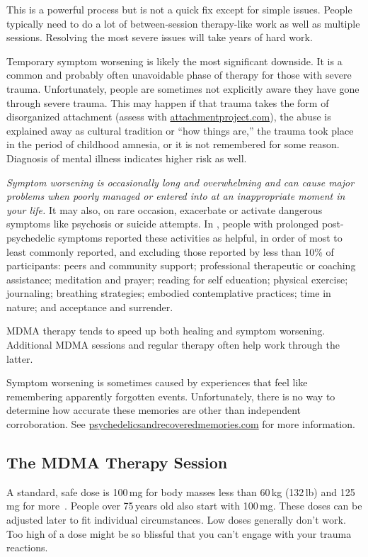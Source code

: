 \documentclass[11pt,oneside]{book}
\newcommand{\mdcite}[1]{}
\begin{document}
This is a powerful process but is not a quick fix except for simple issues. People typically need to do a lot of between-session therapy-like work as well as multiple sessions. Resolving the most severe issues will take years of hard work.

Temporary symptom worsening is likely the most significant downside. It is a common and probably often unavoidable phase of therapy for those with severe trauma. Unfortunately, people are sometimes not explicitly aware they have gone through severe trauma. This may happen if that trauma takes the form of disorganized attachment (assess with \href{https://www.attachmentproject.com}{attachmentproject.com}), the abuse is explained away as cultural tradition or \enquote{how things are,} the trauma took place in the period of childhood amnesia, or it is not remembered for some reason. Diagnosis of mental illness indicates higher risk as well.

\textit{Symptom worsening is occasionally long and overwhelming and can cause major problems when poorly managed or entered into at an inappropriate moment in your life.} It may also, on rare occasion, exacerbate or activate dangerous symptoms like psychosis or suicide attempts. In \textcite{robinson2024coming}, people with prolonged post-psychedelic symptoms reported these activities as helpful, in order of most to least commonly reported, and excluding those reported by less than 10\% of participants: peers and community support; professional therapeutic or coaching assistance; meditation and prayer; reading for self education; physical exercise; journaling; breathing strategies; embodied contemplative practices; time in nature; and acceptance and surrender.

MDMA therapy tends to speed up both healing and symptom worsening. Additional MDMA sessions and regular therapy often help work through the latter.

Symptom worsening is sometimes caused by experiences that feel like remembering apparently forgotten events. Unfortunately, there is no way to determine how accurate these memories are other than independent corroboration. See \href{https://psychedelicsandrecoveredmemories.com}{psychedelicsandrecoveredmemories.com} for more information.

\subsection*{The MDMA Therapy Session}
A standard, safe dose is 100\,mg for body masses less than 60\,kg (132\,lb) and 125\,mg for more~\mdcite{liechtiInteractions,baggottSupplements}. People over 75\,years old also start with 100\,mg. These doses can be adjusted later to fit individual circumstances. Low doses generally don't work. Too high of a dose might be so blissful that you can't engage with your trauma reactions.
\end{document}
